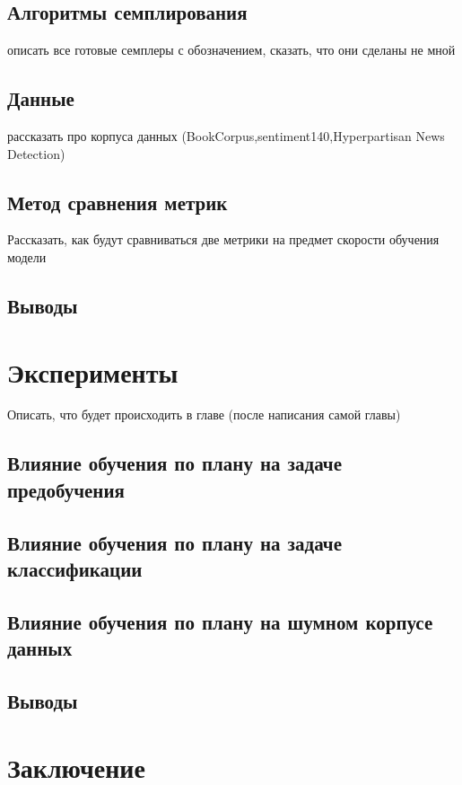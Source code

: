 \documentclass{spbau-diploma}
\begin{document}
\subsection{Алгоритмы семплирования}
описать все готовые семплеры с обозначением, сказать, что они сделаны не мной
\subsection{Данные}
рассказать про корпуса данных (BookCorpus,sentiment140,Hyperpartisan News Detection)
\subsection{Метод сравнения метрик}
Рассказать, как будут сравниваться две метрики на предмет скорости обучения модели
\subsection{Выводы}
\section{Эксперименты}
Описать, что будет происходить в главе (после написания самой главы)
\subsection{Влияние обучения по плану на задаче предобучения}
\subsection{Влияние обучения по плану на задаче классификации}
\subsection{Влияние обучения по плану на шумном корпусе данных}
\subsection{Выводы}
\section*{Заключение}





\end{document}
